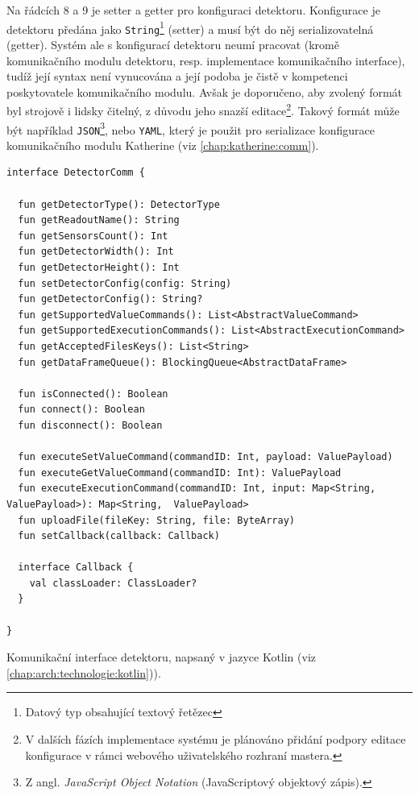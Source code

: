 Na řádcích 8 a 9 je setter a getter pro konfiguraci detektoru. Konfigurace je detektoru předána jako \texttt{String}\footnote{Datový typ obsahující textový řetězec} (setter) a musí být do něj serializovatelná (getter). Systém ale s konfigurací detektoru neumí pracovat (kromě komunikačního modulu detektoru, resp. implementace komunikačního interface), tudíž její syntax není vynucována a její podoba je čistě v kompetenci poskytovatele komunikačního modulu. Avšak je doporučeno, aby zvolený formát byl strojově i lidsky čitelný, z důvodu jeho snazší editace\footnote{V dalších fázích implementace systému je plánováno přidání podpory editace konfigurace v rámci webového uživatelského rozhraní mastera.}. Takový formát může být například \texttt{JSON}\footnote{Z angl. \textit{JavaScript Object Notation} (JavaScriptový objektový zápis).}, nebo \texttt{YAML}, který je použit pro serializace konfigurace komunikačního modulu Katherine (viz \ref{chap:katherine:comm}).

\begin{code}[h!]
\begin{verbatim}
interface DetectorComm {

  fun getDetectorType(): DetectorType
  fun getReadoutName(): String
  fun getSensorsCount(): Int
  fun getDetectorWidth(): Int
  fun getDetectorHeight(): Int
  fun setDetectorConfig(config: String)
  fun getDetectorConfig(): String?
  fun getSupportedValueCommands(): List<AbstractValueCommand>
  fun getSupportedExecutionCommands(): List<AbstractExecutionCommand>
  fun getAcceptedFilesKeys(): List<String>
  fun getDataFrameQueue(): BlockingQueue<AbstractDataFrame>
  
  fun isConnected(): Boolean
  fun connect(): Boolean
  fun disconnect(): Boolean
  
  fun executeSetValueCommand(commandID: Int, payload: ValuePayload)
  fun executeGetValueCommand(commandID: Int): ValuePayload
  fun executeExecutionCommand(commandID: Int, input: Map<String, ValuePayload>): Map<String,  ValuePayload>
  fun uploadFile(fileKey: String, file: ByteArray)
  fun setCallback(callback: Callback)
  
  interface Callback {
    val classLoader: ClassLoader?
  }

}
\end{verbatim}
\caption{Komunikační interface detektoru, napsaný v jazyce Kotlin (viz \ref{chap:arch:technologie:kotlin})).}
\label{src:handler:comm_intf}
\end{code}

